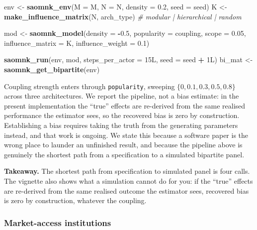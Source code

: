 \documentclass[
]{article}
\newenvironment{Shaded}{\begin{snugshade}}{\end{snugshade}}
\newcommand{\AttributeTok}[1]{\textcolor[rgb]{0.13,0.29,0.53}{#1}}
\newcommand{\CommentTok}[1]{\textcolor[rgb]{0.56,0.35,0.01}{\textit{#1}}}
\newcommand{\DataTypeTok}[1]{\textcolor[rgb]{0.13,0.29,0.53}{#1}}
\newcommand{\DecValTok}[1]{\textcolor[rgb]{0.00,0.00,0.81}{#1}}
\newcommand{\FloatTok}[1]{\textcolor[rgb]{0.00,0.00,0.81}{#1}}
\newcommand{\FunctionTok}[1]{\textcolor[rgb]{0.13,0.29,0.53}{\textbf{#1}}}
\newcommand{\NormalTok}[1]{#1}
\newcommand{\OtherTok}[1]{\textcolor[rgb]{0.56,0.35,0.01}{#1}}
\newcommand{\SpecialCharTok}[1]{\textcolor[rgb]{0.81,0.36,0.00}{\textbf{#1}}}
\begin{document}
\begin{Shaded}
\begin{Highlighting}[]
\NormalTok{env }\OtherTok{\textless{}{-}} \FunctionTok{saomnk\_env}\NormalTok{(}\AttributeTok{M =}\NormalTok{ M, }\AttributeTok{N =}\NormalTok{ N, }\AttributeTok{density =} \FloatTok{0.2}\NormalTok{, }\AttributeTok{seed =}\NormalTok{ seed)}
\NormalTok{K   }\OtherTok{\textless{}{-}} \FunctionTok{make\_influence\_matrix}\NormalTok{(N, arch\_type)      }\CommentTok{\# modular | hierarchical | random}

\NormalTok{mod }\OtherTok{\textless{}{-}} \FunctionTok{saomnk\_model}\NormalTok{(}\AttributeTok{density =} \SpecialCharTok{{-}}\FloatTok{0.5}\NormalTok{, }\AttributeTok{popularity =}\NormalTok{ coupling,}
                    \AttributeTok{scope =} \FloatTok{0.05}\NormalTok{, }\AttributeTok{influence\_matrix =}\NormalTok{ K, }\AttributeTok{influence\_weight =} \FloatTok{0.1}\NormalTok{)}

\FunctionTok{saomnk\_run}\NormalTok{(env, mod, }\AttributeTok{steps\_per\_actor =} \DecValTok{15}\DataTypeTok{L}\NormalTok{, }\AttributeTok{seed =}\NormalTok{ seed }\SpecialCharTok{+} \DecValTok{1}\DataTypeTok{L}\NormalTok{)}
\NormalTok{bi\_mat }\OtherTok{\textless{}{-}} \FunctionTok{saomnk\_get\_bipartite}\NormalTok{(env)}
\end{Highlighting}
\end{Shaded}

Coupling strength enters through \texttt{popularity}, sweeping
\(\{0, 0.1, 0.3,
0.5, 0.8\}\) across three architectures. We report the pipeline, not a
bias estimate: in the present implementation the ``true'' effects are
re-derived from the same realised performance the estimator sees, so the
recovered bias is zero by construction. Establishing a bias requires
taking the truth from the generating parameters instead, and that work
is ongoing. We state this because a software paper is the wrong place to
launder an unfinished result, and because the pipeline above is
genuinely the shortest path from a specification to a simulated
bipartite panel.

\textbf{Takeaway.} The shortest path from specification to simulated
panel is four calls. The vignette also shows what a simulation cannot do
for you: if the ``true'' effects are re-derived from the same realised
outcome the estimator sees, recovered bias is zero by construction,
whatever the coupling.

\subsubsection{Market-access institutions}\label{sec:app-international}
\end{document}
